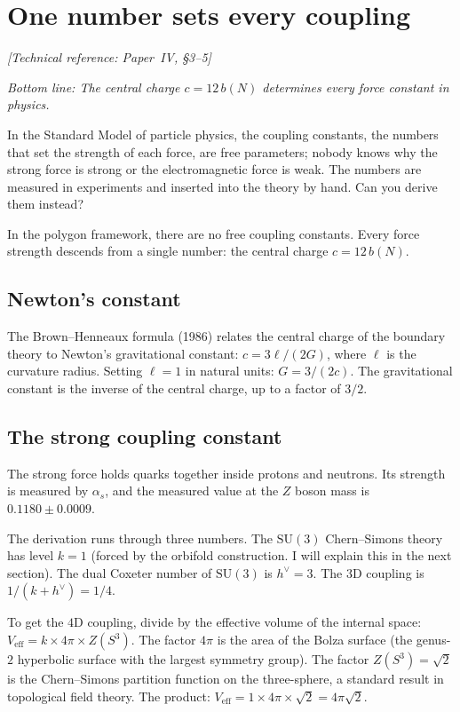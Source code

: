 \section{One number sets every coupling}
\noindent\textit{[Technical reference: Paper~IV, \S3--5]}

\medskip

\noindent\textit{Bottom line: The central charge $c = 12\,b(N)$
determines every force constant in physics.}

\medskip

In the Standard Model of particle physics, the coupling constants, the
numbers that set the strength of each force, are free parameters;
nobody knows why the strong force is strong or the electromagnetic
force is weak. The numbers are measured in experiments and inserted
into the theory by hand. Can you derive them instead?

In the polygon framework, there are no free coupling constants. Every
force strength descends from a single number: the central charge
$c = 12\,b(N)$.

\subsection*{Newton's constant}

The Brown--Henneaux formula (1986) relates the central charge of the
boundary theory to Newton's gravitational constant:
$c = 3\ell/(2G)$, where $\ell$ is the curvature radius. Setting
$\ell = 1$ in natural units: $G = 3/(2c)$. The gravitational constant
is the inverse of the central charge, up to a factor of $3/2$.

\subsection*{The strong coupling constant}

The strong force holds quarks together inside protons and neutrons.
Its strength is measured by $\alpha_s$, and the measured value at the
$Z$ boson mass is $0.1180 \pm 0.0009$.

The derivation runs through three numbers. The $\mathrm{SU}(3)$
Chern--Simons theory has level $k = 1$ (forced by the orbifold
construction. I will explain this in the next section). The dual
Coxeter number of $\mathrm{SU}(3)$ is $h^\vee = 3$. The $3$D coupling
is $1/(k + h^\vee) = 1/4$.

To get the $4$D coupling, divide by the effective volume of the
internal space: $V_{\text{eff}} = k \times 4\pi \times Z(S^3)$. The
factor $4\pi$ is the area of the Bolza surface (the genus-$2$
hyperbolic surface with the largest symmetry group). The factor
$Z(S^3) = \sqrt{2}$ is the Chern--Simons partition function on the
three-sphere, a standard result in topological field theory. The
product: $V_{\text{eff}} = 1 \times 4\pi \times \sqrt{2} = 4\pi\sqrt{2}$.

